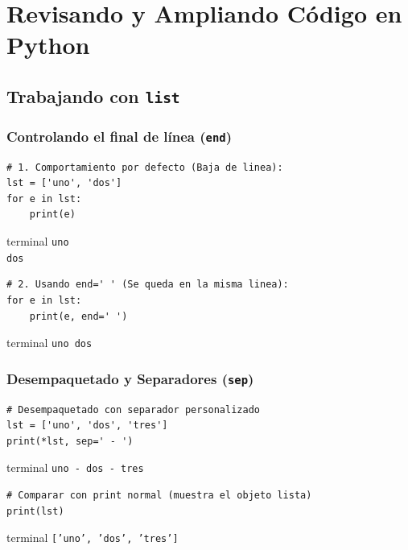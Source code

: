 \documentclass[11pt]{beamer}
\newcommand{\terminal}[1]{
    \vspace{-0.2em}
    \begin{beamercolorbox}[wd=\linewidth, sep=0.3em, rounded=false, shadow=false]{terminal}
    \texttt{#1}
    \end{beamercolorbox}
    \vspace{0.2em}
}
\begin{document}
\section{Revisando y Ampliando Código en Python}

\subsection{Trabajando con \texttt{list}}

\begin{frame}[fragile]\frametitle{Controlando el final de línea (\texttt{end})}
\begin{lstlisting}[basicstyle=\scriptsize]
# 1. Comportamiento por defecto (Baja de linea):
lst = ['uno', 'dos']
for e in lst:
    print(e)
\end{lstlisting}
\terminal{uno\\dos}

\begin{lstlisting}[basicstyle=\scriptsize]
# 2. Usando end=' ' (Se queda en la misma linea):
for e in lst:
    print(e, end=' ')
\end{lstlisting}
\terminal{uno dos}
\end{frame}

\begin{frame}[fragile]\frametitle{Desempaquetado y Separadores (\texttt{sep})}
\begin{lstlisting}
# Desempaquetado con separador personalizado
lst = ['uno', 'dos', 'tres']
print(*lst, sep=' - ')
\end{lstlisting}
\terminal{uno - dos - tres}

\begin{lstlisting}
# Comparar con print normal (muestra el objeto lista)
print(lst)
\end{lstlisting}
\terminal{['uno', 'dos', 'tres']}
\end{frame}
\end{document}
